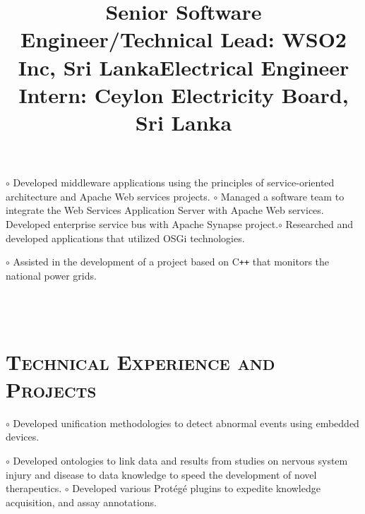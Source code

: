 \begin{resume}
\title{\textbf{Senior Software Engineer/Technical Lead: WSO2 Inc, Sri Lanka}}
\begin{position}
$\circ$ Developed middleware applications using the principles of service-oriented 
architecture and Apache Web services projects.   \newline $\circ$ 
Managed a software team to integrate the Web Services Application Server with Apache Web services. 
Developed enterprise service bus with Apache Synapse project.\newline $\circ$ Researched and 
developed 
applications that utilized OSGi technologies. 
\end{position}


\title{\textbf{Electrical Engineer Intern: Ceylon Electricity Board, Sri Lanka}}
\begin{position}
$\circ$ Assisted in the development of a project based on C\texttt{++} that monitors the national 
power 
grids. 
\end{position}



\begin{formatb}
  \\
  \body\\
\end{formatb}

\vspace{-2mm}
\section{\textsc{Technical Experience and Projects}}

\begin{position}
$\circ$ Developed  unification methodologies to detect abnormal events using embedded devices.
\end{position}

\begin{position}
$\circ$ Developed ontologies to link data 
and results from studies on nervous system injury and disease to data knowledge to speed the 
development of novel therapeutics. \newline $\circ$ Developed  various Prot\'{e}g\'{e} plugins to 
expedite knowledge acquisition, and assay annotations.
\end{position}


\end{resume}
